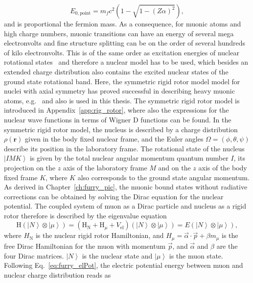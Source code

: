 \begin{equation}
E_{0,\text{point}}=m_f c^2 (1-\sqrt{1-(Z\alpha)^2}),
\end{equation}
and is proportional the fermion mass. As a consequence, for muonic atoms and high charge numbers, muonic transitions can have an energy of several mega electronvolts and fine structure splitting can be on the order of several hundreds of kilo electronvolts. This is of the same order as excitation energies of nuclear rotational states~\cite{ENSDF} and therefore a nuclear model has to be used, which besides an extended charge distribution also contains the excited nuclear states of the ground state rotational band. Here, the symmetric rigid rotor model model for nuclei with axial symmetry has proved successful in describing heavy muonic atoms, e.g.~\cite{tanaka1984,hitlin1970,wu1969,Devons1995} and also is used in this thesis. The symmetric rigid rotor model is introduced in Appendix~\ref{app:rig_rotor}, where also the expressions for the nuclear wave functions in terms of Wigner D functions can be found. In the symmetric rigid rotor model, the nucleus is described by a charge distribution $\rho(\mathbf{r})$ given in the body fixed nuclear frame, and the Euler angles $\Omega=(\phi,\theta,\psi)$ describe its position in the laboratory frame. The rotational state of the nucleus $\left|IMK\right>$ is given by the total nuclear angular momentum quantum number $I$, its projection on the $z$ axis of the laboratory frame $M$ and on the $z$ axis of the body fixed frame $K$, where $K$ also corresponds to the ground state angular momentum. As derived in Chapter~\ref{ch:furry_pic}, the muonic bound states without radiative corrections can be obtained by solving the Dirac equation for the nuclear potential. The coupled system of muon as a Dirac particle and nucleus as a rigid rotor therefore is described by the eigenvalue equation
\begin{equation}
\text{H} \left(\left|N\right>\otimes \left|\mu\right>\right)= \left(\text{H}_{\text{N}} + \text{H}_\mu + V_{\text{el}}\right) \left(\left|N\right>\otimes \left|\mu\right>\right)= E \left(\left|N\right>\otimes \left|\mu\right>\right),
\label{eq:muon_htotal}
\end{equation}
where $H_{\text{N}}$ is the nuclear rigid rotor Hamiltonian, and ${H_\mu}{=}{\vec{\alpha} \cdot \vec{p} + \beta m_\mu}$ is the free Dirac Hamiltonian for the muon with momentum $\vec{p}$, and $\vec{\alpha}$ and $\beta$ are the four Dirac matrices. $\left|N\right>$ is the nuclear state and $\left|\mu\right>$ is the muon state. Following Eq.~\eqref{eq:furry_elPot}, the electric potential energy between muon and nuclear charge distribution reads as
